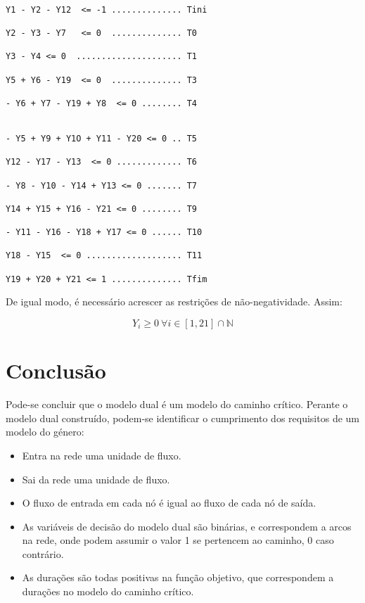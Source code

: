 \begin{verbatim}

Y1 - Y2 - Y12  <= -1 .............. Tini 

Y2 - Y3 - Y7   <= 0  .............. T0

Y3 - Y4 <= 0  ..................... T1

Y5 + Y6 - Y19  <= 0  .............. T3

- Y6 + Y7 - Y19 + Y8  <= 0 ........ T4


- Y5 + Y9 + Y1O + Y11 - Y20 <= 0 .. T5

Y12 - Y17 - Y13  <= 0 ............. T6

- Y8 - Y10 - Y14 + Y13 <= 0 ....... T7

Y14 + Y15 + Y16 - Y21 <= 0 ........ T9

- Y11 - Y16 - Y18 + Y17 <= 0 ...... T10

Y18 - Y15  <= 0 ................... T11

Y19 + Y20 + Y21 <= 1 .............. Tfim

\end{verbatim}

De igual modo, é necessário acrescer as restrições de não-negatividade. Assim:

\begin{equation*}	
	Y_i \ge 0~\forall i \in {\left[ 1, 21 \right]\cap\mathbb{N}}
\end{equation*}


\section{Conclusão}

Pode-se concluir que o modelo dual é um modelo do caminho crítico. Perante
o modelo dual construído, podem-se identificar o cumprimento dos requisitos de
um modelo do género:

\begin{itemize}
	\item Entra na rede uma unidade de fluxo.
	\item Sai da rede uma unidade de fluxo.
	\item O fluxo de entrada em cada nó é igual ao fluxo de cada nó de saída.
	\item As variáveis de decisão do modelo dual são binárias, e correspondem
		a arcos na rede, onde podem assumir o valor 1 se pertencem ao caminho,
		0 caso contrário.
	\item As durações são todas positivas na função objetivo, que correspondem
		a durações no modelo do caminho crítico.
\end{itemize}


